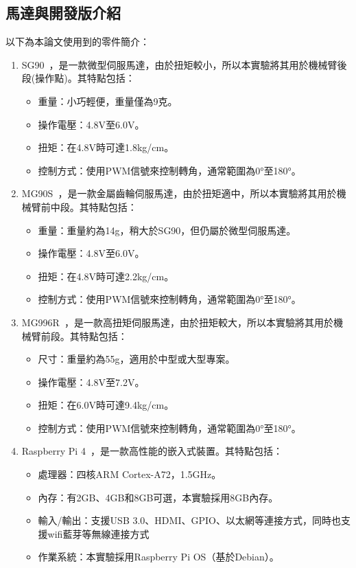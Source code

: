 \documentclass[class=NCU_thesis, crop=false]{standalone}
\begin{document}
\subsection{馬達與開發版介紹}
以下為本論文使用到的零件簡介：

\begin{enumerate}
\item SG90~\cite{sg90_servo_motor}，是一款微型伺服馬達，由於扭矩較小，所以本實驗將其用於機械臂後段(操作點)。其特點包括：
\begin{itemize}
    \item 重量：小巧輕便，重量僅為9克。
    \item 操作電壓：4.8V至6.0V。
    \item 扭矩：在4.8V時可達1.8kg/cm。
    \item 控制方式：使用PWM信號來控制轉角，通常範圍為0°至180°。
\end{itemize}

\item MG90S~\cite{mg90s_servo_motor}，是一款金屬齒輪伺服馬達，由於扭矩適中，所以本實驗將其用於機械臂前中段。其特點包括：
\begin{itemize}
    \item 重量：重量約為14g，稍大於SG90，但仍屬於微型伺服馬達。
    \item 操作電壓：4.8V至6.0V。
    \item 扭矩：在4.8V時可達2.2kg/cm。
    \item 控制方式：使用PWM信號來控制轉角，通常範圍為0°至180°。
\end{itemize}

\item MG996R~\cite{mg996r_servo_motor}，是一款高扭矩伺服馬達，由於扭矩較大，所以本實驗將其用於機械臂前段。其特點包括：
\begin{itemize}
    \item 尺寸：重量約為55g，適用於中型或大型專案。
    \item 操作電壓：4.8V至7.2V。
    \item 扭矩：在6.0V時可達9.4kg/cm。
    \item 控制方式：使用PWM信號來控制轉角，通常範圍為0°至180°。
\end{itemize}

\item Raspberry Pi 4~\cite{raspberry_pi_4}，是一款高性能的嵌入式裝置。其特點包括：
\begin{itemize}
    \item 處理器：四核ARM Cortex-A72，1.5GHz。
    \item 內存：有2GB、4GB和8GB可選，本實驗採用8GB內存。
    \item 輸入/輸出：支援USB 3.0、HDMI、GPIO、以太網等連接方式，同時也支援wifi藍芽等無線連接方式
    \item 作業系統：本實驗採用Raspberry Pi OS（基於Debian）。
\end{itemize}


\end{enumerate}
\end{document}
